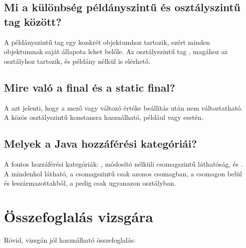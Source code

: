 \subsection{Mi a különbség példányszintű és osztályszintű tag között?}

A példányszintű tag egy konkrét objektumhoz tartozik, ezért minden objektumnak saját állapota lehet belőle. Az osztályszintű tag , magához az osztályhoz tartozik, és példány nélkül is elérhető.

\subsection{Mire való a final és a static final?}

A  azt jelenti, hogy a mező vagy változó értéke beállítás után nem változtatható. A  közös osztályszintű konstansra használható, például  vagy  esetén.

\subsection{Melyek a Java hozzáférési kategóriái?}

A fontos hozzáférési kategóriák: , módosító nélküli csomagszintű láthatóság,  és . A  mindenhol látható, a csomagszintű csak azonos csomagban, a  csomagon belül és leszármazottakból, a  pedig csak ugyanazon osztályban.

\section{Összefoglalás vizsgára}

Rövid, vizsgán jól használható összefoglalás:

